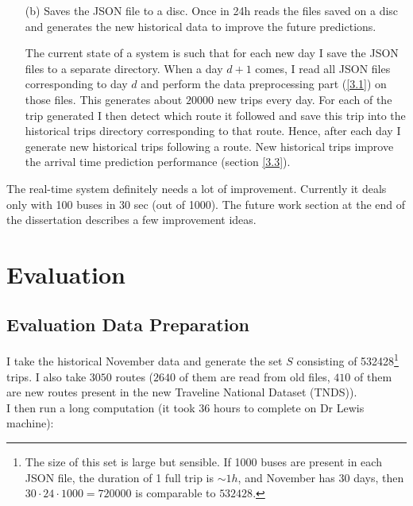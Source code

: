 \documentclass[12pt,a4paper,oneside,openright]{report}
\begin{document}
\begin{enumerate}
\begin{itemize}
\end{itemize}



\item[(b)] Saves the JSON file to a disc. Once in 24h reads the files saved on a disc
and generates the new historical data to improve the future predictions.

The current state of a system is such that for each new day I save the JSON files
to a separate directory. When a day $d+1$ comes, I read all JSON files corresponding
to day $d$ and perform the data preprocessing part (\textcolor{blue}{\ref{3.1}}) on those files. This generates
about $20000$ new trips every day. For each of the trip generated I then detect
which route it followed and save this trip into the historical trips directory
corresponding to that route. Hence, after each day I generate new historical trips
following a route. New historical trips improve the arrival time prediction
performance (section \textcolor{blue}{\ref{3.3}}).

\end{enumerate}

The real-time system definitely needs a lot of improvement. Currently it deals only with 100 buses
in 30 sec (out of 1000). The future work section at the end of the dissertation describes a few
improvement ideas.

\chapter{Evaluation}

\section{Evaluation Data Preparation}

\label{4.1}

I take the historical November data and generate the set $S$ consisting of 532428\footnote{
The size of this set is large but sensible. If 1000 buses are present in each JSON file,
the duration of 1 full trip is $\sim1h$, and November has 30 days, 
then $30 \cdot 24 \cdot 1000 = 720000$ is comparable to $532428$.} trips. I also take $3050$ routes
($2640$ of them are read from old files, $410$ of them are new routes present
in the new Traveline National Dataset (TNDS)). \\

I then run a long computation (it took 36 hours to complete on Dr Lewis machine): \\
\end{document}
